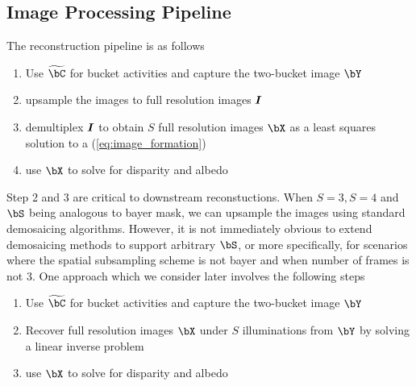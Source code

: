 \documentclass[../writeup.tex]{subfiles}
\begin{document}
\subsection{Image Processing Pipeline}
The reconstruction pipeline is as follows
\begin{enumerate}
    \item Use $\widetilde{\bC}$ for bucket activities and capture the two-bucket image $\bY$
    \item upsample the images to full resolution images $\boldsymbol{I}$
    \item demultiplex $\boldsymbol{I}$ to obtain $S$ full resolution images $\bX$ as a least squares solution to a (\ref{eq:image_formation})
    \item use $\bX$ to solve for disparity and albedo
\end{enumerate}
Step 2 and 3 are critical to downstream reconstuctions. When $S=3,S=4$ and $\bS$ being analogous to bayer mask, we can upsample the images using standard demosaicing algorithms. However, it is not immediately obvious to extend demosaicing methods to support arbitrary $\bS$, or more specifically, for scenarios where the spatial subsampling scheme is not bayer and when number of frames is not 3. One approach which we consider later involves the following steps
\begin{enumerate}
    \item Use $\widetilde{\bC}$ for bucket activities and capture the two-bucket image $\bY$
    \item Recover full resolution images $\bX$ under $S$ illuminations from $\bY$ by solving a linear inverse problem
    \item use $\bX$ to solve for disparity and albedo
\end{enumerate}
\end{document}
